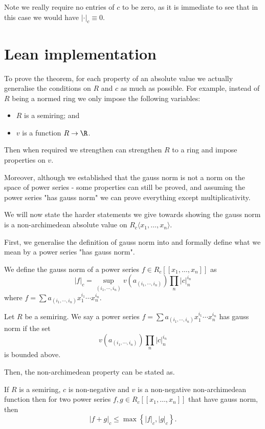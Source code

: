 Note we really require no entries of $c$ to be zero, as it is immediate to see that in this case we
would have $\lvert \cdot \rvert_c \equiv 0$.

\section{Lean implementation}

To prove the theorem, for each property of an absolute value we actually generalise the conditions
on $R$ and $c$ as much as possible. For example, instead of $R$ being a normed ring we only impose the
following variables:

\begin{itemize}
  \item $R$ is a semiring; and
  \item $v$ is a function $R \to \R$.
\end{itemize}

Then when required we strengthen can strengthen $R$ to a ring and impose properties on $v$.

Moreover, although we established that the gauss norm is not a norm on the space of power series -
some properties can still be proved, and assuming the power series "has gauss norm" we can prove
everything except multiplicativity.

We will now state the harder statements we give towards showing the gauss norm is a
non-archimedean absolute value on $R_c \langle x_1, \dots, x_n \rangle$.

First, we generalise the definition of gauss norm into and formally define what we mean by a power
series "has gauss norm".

\begin{definition}
  We define the gauss norm of a power series $f \in R_c [ \! [ x_1, \dots, x_n ] \! ]$ as
  \[
    \lvert f \rvert_c = \sup_{(i_1, \cdots, i_n)} v (a_{(i_1, \cdots, i_n)})  \prod_n \lvert c \rvert _n^{i_n}
  \]
  where $f = \sum a_{(i_1, \cdots, i_n)} x_1^{i_1} \cdots x_n^{i_n}$.
\end{definition}

\begin{definition}
  Let $R$ be a semiring. We say a power series $f = \sum a_{(i_1, \cdots, i_n)} x_1^{i_1} \cdots x_n^{i_n}$
  has gauss norm if the set
  \[
    v (a_{(i_1, \cdots, i_n)})  \prod_n \lvert c \rvert _n^{i_n}
  \]
  is bounded above.
\end{definition}

Then, the non-archimedean property can be stated as.

\begin{lemma}
  If $R$ is a semiring, $c$ is non-negative and $v$ is a non-negative non-archimedean function then
  for two power series $f, g \in R_c [ \! [ x_1, \dots, x_n ] \! ]$ that have gauss norm, then
  \[
    \lvert f + g \rvert_c \leq \max \left\{ \lvert f \rvert_c, \lvert g \rvert_c \right\}.
  \]
\end{lemma}

